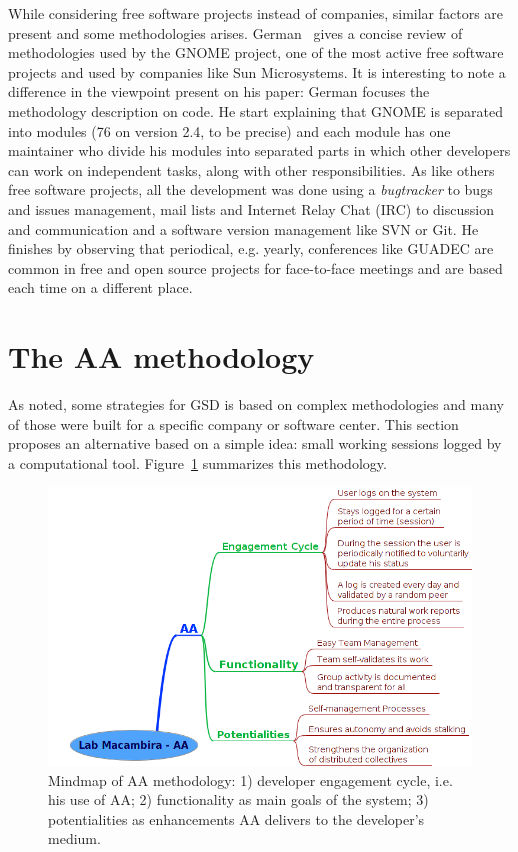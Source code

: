 \documentclass[letterpaper]{article}
\begin{document}
While considering free software projects instead of companies, similar factors
are present and some methodologies arises. German~\cite{german2003} gives a
concise review of methodologies used by the GNOME project, one of the most
active free software projects and used by companies like Sun Microsystems. It is
interesting to note a difference in the viewpoint present on his paper: German
focuses the methodology description on code. He start explaining that GNOME is
separated into modules (76 on version 2.4, to be precise) and each module has
one maintainer who divide his modules into separated parts in which other
developers can work on independent tasks, along with other responsibilities. As like
others free software projects, all the development was done using a
\emph{bugtracker} to bugs and issues management, mail lists and Internet Relay
Chat (IRC) to discussion and communication and a software version
management like SVN or Git. He finishes by observing that periodical, e.g. yearly, conferences like GUADEC
are common in free and open source projects for face-to-face meetings and are based
each time on a different place.

\section{The AA methodology}
\label{aa-methodology}

As noted, some strategies for GSD is based on complex methodologies and many of
those were built for a specific company or software center. This section proposes an
alternative based on a simple idea: small working sessions logged by
a computational tool. Figure~\ref{fig:mm} summarizes this methodology.

\begin{figure}
\begin{center}
   \includegraphics[width=0.8\linewidth,keepaspectratio=true]{figs/aa-mm2.png}
\end{center}
   \caption{
   Mindmap of AA methodology: 1) developer engagement cycle, i.e. his use of AA; 2) functionality as main goals of the system; 3) potentialities as enhancements AA delivers to the developer's medium. 
   }
\label{fig:mm}
\end{figure}
\end{document}
